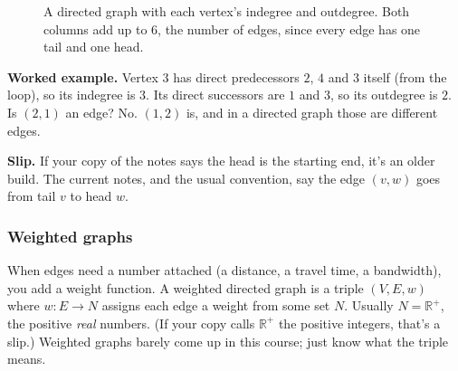 \begin{figure}[H]
\centering
{}
\caption{A directed graph with each vertex's indegree and outdegree. Both columns add up to $6$, the number of edges, since every edge has one tail and one head.}
\end{figure}

\textbf{Worked example.} Vertex $3$ has direct predecessors $2$, $4$ and $3$ itself (from the loop), so its indegree is $3$. Its direct successors are $1$ and $3$, so its outdegree is $2$. Is $(2,1)$ an edge? No. $(1,2)$ is, and in a directed graph those are different edges.

\textbf{Slip.} If your copy of the notes says the head is the starting end, it's an older build. The current notes, and the usual convention, say the edge $(v,w)$ goes from tail $v$ to head $w$.

\subsubsection{Weighted graphs}

When edges need a number attached (a distance, a travel time, a bandwidth), you add a weight function. A weighted directed graph is a triple $(V,E,w)$ where $w:E\to N$ assigns each edge a weight from some set $N$. Usually $N=\mathbb{R}^{+}$, the positive \emph{real} numbers. (If your copy calls $\mathbb{R}^{+}$ the positive integers, that's a slip.) Weighted graphs barely come up in this course; just know what the triple means.

